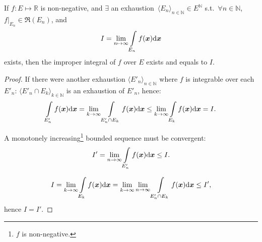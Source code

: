 \documentclass[openany]{book}
\begin{document}
\begin{theorem}
	\label{theorem: convergence of improper integral for non-negative function}
	If $f \colon E \mapsto \mathbb R$ is non-negative, and $\exists$ an exhaustion~$\langle E_n \rangle_{n \in \mathbb N} \in E^\mathbb N$ s.t.\ $\forall n \in \mathbb N$, $f|_{E_n} \in \mathfrak R(E_n)$, and
	\begin{equation*}
		I = \lim_{n \mapsto \infty} \int\limits_{E_n} f(\boldsymbol{x}) \mathrm{d} \boldsymbol{x}
	\end{equation*}
	exists, then the improper integral of $f$ over $E$ exists and equals to $I$. 
\end{theorem}
\begin{proof}
	If there were another exhaustion $\langle E'_n \rangle_{n \in \mathbb N}$ where $f$ is integrable over each $E'_n$: $\langle E'_n \cap E_k \rangle_{k \in \mathbb N}$ is an exhaustion of $E'_n$, hence:
	\begin{equation*}
		\int\limits_{E'_n} f(\boldsymbol{x}) \mathrm{d} \boldsymbol{x}
		 = \lim_{k \to \infty} \int\limits_{E'_n \cap E_k} f(\boldsymbol{x}) \mathrm{d} \boldsymbol{x} 
		\leq  \lim_{k \to \infty} \int\limits_{E_k} f(\boldsymbol{x}) \mathrm{d} \boldsymbol{x} = I.
	\end{equation*}

	A monotonely increasing\footnote{$f$ is non-negative.} bounded sequence must be convergent:
	\begin{equation*}
		I' = \lim_{n \to \infty} \int\limits_{E'_n} f(\boldsymbol{x}) \mathrm{d} \boldsymbol{x} \leq I.
	\end{equation*}

	\begin{equation*}
		I = \lim_{k \to \infty} \int\limits_{E_k} f(\boldsymbol{x}) \mathrm{d} \boldsymbol{x} =
		\lim_{k \to \infty} \lim_{n \to \infty} \int\limits_{E'_n \cap E_k} f(\boldsymbol{x}) \mathrm{d} \boldsymbol{x} 
		\leq I',
	\end{equation*}
	hence $I = I'$.
\end{proof}
\end{document}
